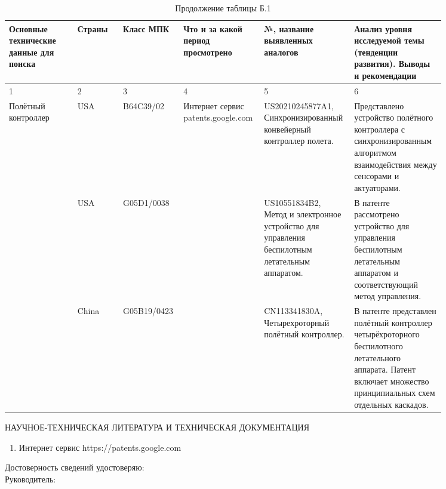 \documentclass[a4paper]{bsuir-std}
\begin{document}
\begin{landscape}
\begin{table}[H]
  \centering
  \caption{Продолжение таблицы Б.1}
  \small
  \begin{tabular}{|p{0.15\linewidth}|p{0.1\linewidth}|p{0.1\linewidth}|p{0.15\linewidth}|p{0.15\linewidth}|p{0.2\linewidth}|}
    \hline
    Основные технические данные для поиска & Страны & Класс МПК
    & Что и за какой период просмотрено                                                  
    & №, название выявленных аналогов
    & Анализ уровня исследуемой темы
      (тенденции развития). Выводы и рекомендации \\ \hline
    1 & 2 & 3 & 4 & 5& 6 \\ \hline
    Полётный контроллер & USA &  B64C39/02
    & Интернет сервис patents.google.com
    & US20210245877A1,  Синхронизированный конвейерный контроллер полета.
    &  Представлено устройство полётного контроллера с синхронизированным алгоритмом взаимодействия между сенсорами и
      актуаторами. \\ \cline{2-3} \cline{5-6}
    & USA & G05D1/0038
    && US10551834B2, Метод и электронное устройство для управления беспилотным летательным аппаратом.
    & В патенте рассмотрено устройство для управления беспилотным летательным аппаратом
      и соответствующий метод управления. \\ \cline{2-3} \cline{5-6}
    & China &  G05B19/0423 &
    & CN113341830A, Четырехроторный полётный контроллер.
    & В патенте представлен полётный контроллер четырёхроторного
      беспилотного летательного аппарата.
       Патент включает множество принципиальных схем отдельных каскадов. \\ \hline
                                                      
  \end{tabular}
\end{table}

\end{landscape}

\thispagestyle{empty} %
\begin{center}
  НАУЧНОЕ-ТЕХНИЧЕСКАЯ ЛИТЕРАТУРА И ТЕХНИЧЕСКАЯ ДОКУМЕНТАЦИЯ 
\end{center}
\begin{enumerate}
\item Интернет сервис https://patents.google.com
\end{enumerate}
\vspace{\fill}

Достоверность сведений удостоверяю:\\

Руководитель: \underline{\hspace*{5.6cm}}
\end{document}

